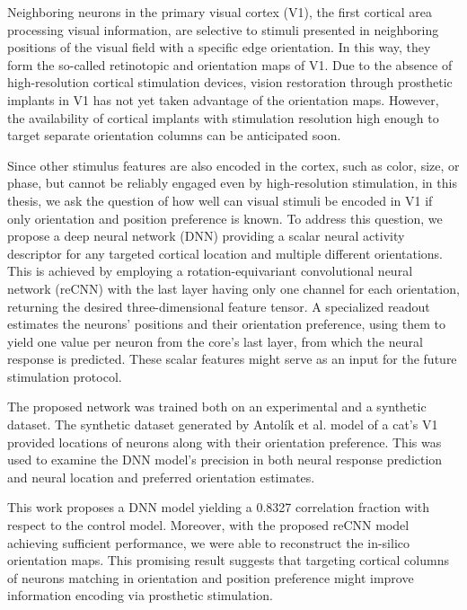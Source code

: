 \documentclass[12pt]{report}
\begin{document}
Neighboring neurons in the primary visual cortex (V1), the first cortical area processing visual information, are selective to stimuli presented in neighboring positions of the visual field with a specific edge orientation. In this way, they form the so-called retinotopic and orientation maps of V1. Due to the absence of high-resolution cortical stimulation devices, vision restoration through prosthetic implants in V1 has not yet taken advantage of the orientation maps. However, the availability of cortical implants with stimulation resolution high enough to target separate orientation columns can be anticipated soon. 

Since other stimulus features are also encoded in the cortex, such as color, size, or phase, but cannot be reliably engaged even by high-resolution stimulation, in this thesis, we ask the question of how well can visual stimuli be encoded in V1 if only orientation and position preference is known. To address this question, we propose a deep neural network (DNN) providing a scalar neural activity descriptor for any targeted cortical location and multiple different orientations. This is achieved by employing a rotation-equivariant convolutional neural network (reCNN) with the last layer having only one channel for each orientation, returning the desired three-dimensional feature tensor. A specialized readout estimates the neurons’ positions and their orientation preference, using them to yield one value per neuron from the core’s last layer, from which the neural response is predicted. These scalar features might serve as an input for the future stimulation protocol.

The proposed network was trained both on an experimental and a synthetic dataset. The synthetic dataset generated by Antolík et al. model of a cat’s V1 provided locations of neurons along with their orientation preference. This was used to examine the DNN model’s precision in both neural response prediction and neural location and preferred orientation estimates. 

This work proposes a DNN model yielding a 0.8327 correlation fraction with respect to the control model. Moreover, with the proposed reCNN model achieving sufficient performance, we were able to reconstruct the in-silico orientation maps. This promising result suggests that targeting cortical columns of neurons matching in orientation and position preference might improve information encoding via prosthetic stimulation.
\end{document}
